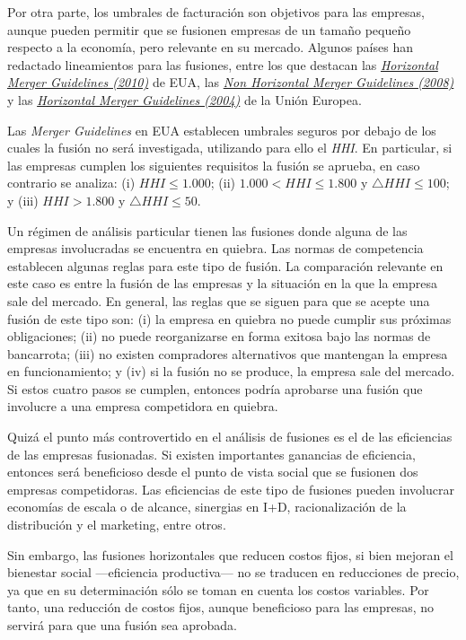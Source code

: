 \documentclass[
  12pt,
  spanish,
]{book}
\begin{document}
Por otra parte, los umbrales de facturación son objetivos para las
empresas, aunque pueden permitir que se fusionen empresas de un tamaño
pequeño respecto a la economía, pero relevante en su mercado. Algunos
países han redactado lineamientos para las fusiones, entre los que
destacan las
\href{https://www.ftc.gov/sites/default/files/attachments/merger-review/100819hmg.pdf}{\emph{Horizontal
Merger Guidelines (2010)}} de EUA, las
\href{https://eur-lex.europa.eu/LexUriServ/LexUriServ.do?uri=OJ:C:2008:265:0006:0025:en:PDF}{\emph{Non
Horizontal Merger Guidelines (2008)}} y las
\href{https://eur-lex.europa.eu/legal-content/EN/TXT/PDF/?uri=CELEX:52004XC0205(02)\&from=EN}{\emph{Horizontal
Merger Guidelines (2004)}} de la Unión Europea.

Las \emph{Merger Guidelines} en EUA establecen umbrales seguros por
debajo de los cuales la fusión no será investigada, utilizando para ello
el \emph{HHI}. En particular, si las empresas cumplen los siguientes
requisitos la fusión se aprueba, en caso contrario se analiza: (i)
\(HHI \leq 1.000\); (ii) \(1.000 < HHI \leq 1.800\) y
\(\bigtriangleup HHI \leq 100\); y (iii) \(HHI > 1.800\) y
\(\bigtriangleup HHI \leq 50\).

Un régimen de análisis particular tienen las fusiones donde alguna de
las empresas involucradas se encuentra en quiebra. Las normas de
competencia establecen algunas reglas para este tipo de fusión. La
comparación relevante en este caso es entre la fusión de las empresas y
la situación en la que la empresa sale del mercado. En general, las
reglas que se siguen para que se acepte una fusión de este tipo son: (i)
la empresa en quiebra no puede cumplir sus próximas obligaciones; (ii)
no puede reorganizarse en forma exitosa bajo las normas de bancarrota;
(iii) no existen compradores alternativos que mantengan la empresa en
funcionamiento; y (iv) si la fusión no se produce, la empresa sale del
mercado. Si estos cuatro pasos se cumplen, entonces podría aprobarse una
fusión que involucre a una empresa competidora en quiebra.

Quizá el punto más controvertido en el análisis de fusiones es el de las
eficiencias de las empresas fusionadas. Si existen importantes ganancias
de eficiencia, entonces será beneficioso desde el punto de vista social
que se fusionen dos empresas competidoras. Las eficiencias de este tipo
de fusiones pueden involucrar economías de escala o de alcance,
sinergias en I+D, racionalización de la distribución y el marketing,
entre otros.

Sin embargo, las fusiones horizontales que reducen costos fijos, si bien
mejoran el bienestar social ---eficiencia productiva--- no se traducen
en reducciones de precio, ya que en su determinación sólo se toman en
cuenta los costos variables. Por tanto, una reducción de costos fijos,
aunque beneficioso para las empresas, no servirá para que una fusión sea
aprobada.
\end{document}

